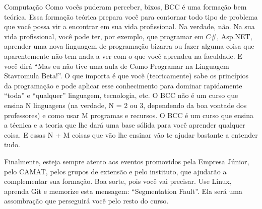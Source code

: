\begin{subsecao}{Computação}
Como vocês puderam perceber, bixos, BCC é uma formação bem teórica. Essa
formação teórica prepara você para contornar todo tipo de problema que você
possa vir a encontrar em sua vida profissional. Na verdade, não. Na sua vida
profissional, você pode ter, por exemplo, que programar em $C\#$, Asp.NET,
aprender uma nova linguagem de programação bizarra ou fazer alguma coisa que
aparentemente não tem nada a ver com o que você aprendeu na faculdade. E você
dirá ``Mas eu não tive uma aula de Como Programar na Linguagem Stavromula
Beta!''. O que importa é que você (teoricamente) sabe os princípios da
programação e pode aplicar esse conhecimento para dominar rapidamente ``toda'' e
``qualquer'' linguagem, tecnologia, etc. O BCC não é um curso que ensina N
linguagens (na verdade, N = 2 ou 3, dependendo da boa vontade dos professores) e
como usar M programas e recursos. O BCC é um curso que ensina a técnica e a
teoria que lhe dará uma base sólida para você aprender qualquer coisa. E essas N
+ M coisas que vão lhe ensinar vão te ajudar bastante a entender tudo.

Finalmente, esteja sempre atento aos eventos promovidos pela Empresa Júnior,
pelo CAMAT, pelos grupos de extensão e pelo instituto, que ajudarão a
complementar sua formação. Boa sorte, pois você vai precisar. Use Linux, aprenda
Git e memorize esta mensagem: ``Segmentation Fault''. Ela será uma assombração
que perseguirá você pelo resto do curso.

\end{subsecao}
